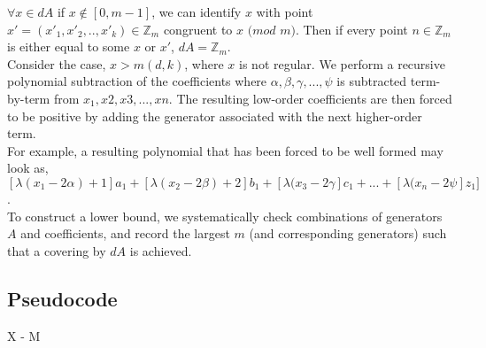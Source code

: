 $\forall x \in dA$ if $x \notin [0, m-1]$, we can identify $x$ with point $x' = (x'_{1}, x'_{2}, .. , x'_{k}) \in \mathbb{Z}_{m}$ congruent to $x$ $(mod$ $m)$.  Then if every point $n \in \mathbb{Z}_{m}$ is either equal to some $x$ or $x'$, $dA = \mathbb{Z}_m$. \\

Consider the case, $x > m(d, k)$, where $x$ is not regular. We perform a recursive polynomial subtraction of the coefficients where $\alpha, \beta, \gamma, ... , \psi$ is subtracted term-by-term from $x_{1}, x{2}, x{3}, ... , x{n}$. The resulting low-order coefficients are then forced to be positive by adding the generator associated with the next higher-order term.\\

For example, a resulting polynomial that has been forced to be well formed may look as, $[\lambda(x_{1} - 2 \alpha) + 1]a_{1} + [\lambda(x_{2} - 2 \beta) + 2]b_{1} + [\lambda(x_{3} - 2 \gamma]c_{1} + ... + [\lambda(x_{n} - 2 \psi]z_{1}]$.\\

To construct a lower bound, we systematically check combinations of generators $A$ and coefficients, and record the largest $m$ (and corresponding generators) such that a covering by $dA$ is achieved.

\subsection{Pseudocode}

\begin{algorithmic}

\State X - M
\EndFor
\end{algorithmic}
